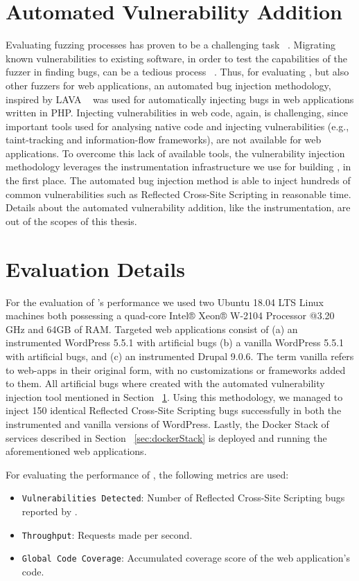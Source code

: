 \section{Automated Vulnerability Addition}\label{sec:automated}
Evaluating fuzzing processes has proven to be a challenging task ~\cite{klees2018Evaluation}. Migrating known vulnerabilities to existing software, in order to test the capabilities of the fuzzer in finding bugs, can be a tedious process ~\cite{bug-reproduction}. Thus, for evaluating \pname{}, but also other fuzzers for web applications, an automated bug injection methodology, inspired by LAVA ~\cite{dolan2016lava} was used for automatically injecting bugs in web applications written in PHP. Injecting vulnerabilities in web code, again, is challenging, since important tools used for analysing native code and injecting vulnerabilities (e.g., taint-tracking and information-flow frameworks), are not available for web applications. To overcome this lack of available tools, the vulnerability injection methodology leverages the instrumentation infrastructure we use for building \pname{}, in the first place. The automated bug injection method is able to inject hundreds of common vulnerabilities such as Reflected Cross-Site Scripting in reasonable time. Details about the automated vulnerability addition, like the instrumentation, are out of the scopes of this thesis.

\section{Evaluation Details}
For the evaluation of \pname{}'s performance we used two Ubuntu 18.04 LTS Linux machines both possessing a quad-core Intel® Xeon® W-2104 Processor @3.20 GHz and 64GB of RAM. Targeted web applications consist of (a) an instrumented WordPress 5.5.1 with artificial bugs (b) a vanilla  WordPress 5.5.1 with artificial bugs, and (c) an instrumented Drupal 9.0.6. The term vanilla refers to web-apps in their original form, with no customizations or frameworks added to them. All artificial bugs where created with the automated vulnerability injection tool mentioned in  Section ~\ref{sec:automated}. Using this methodology, we managed to inject 150 identical Reflected Cross-Site Scripting bugs successfully in both the instrumented and vanilla versions of WordPress. Lastly, the Docker Stack of services described in Section ~\ref{sec:dockerStack} is deployed and running the aforementioned web applications.

For evaluating the performance of \pname{}, the following metrics are used:
\begin{itemize}
	\item {\tt Vulnerabilities Detected}: Number of Reflected Cross-Site Scripting bugs reported by \pname{}.
	\item {\tt Throughput}: Requests made per second.
	\item {\tt Global Code Coverage}: Accumulated coverage score of the web application's code.
\end{itemize}

